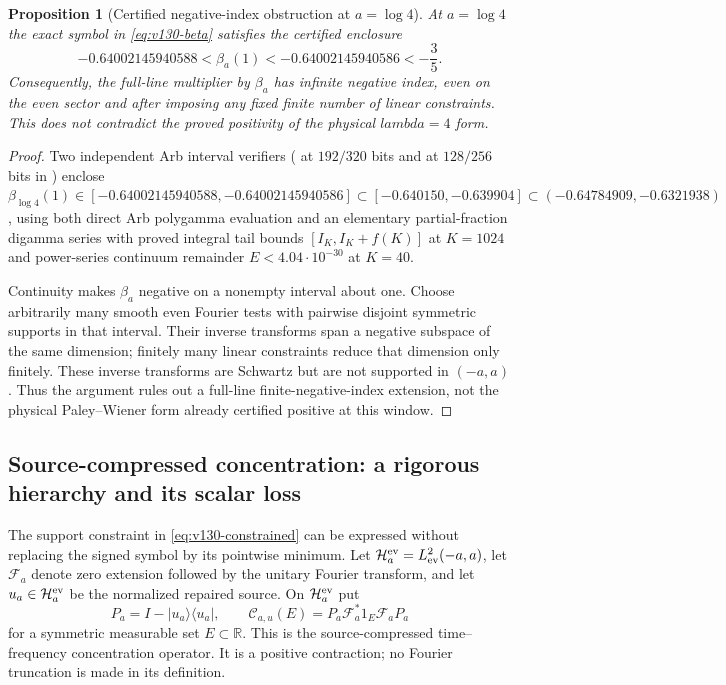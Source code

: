 \documentclass[11pt]{article}
\def\lambda{lambda}%
\newtheorem{proposition}[theorem]{Proposition}
\theoremstyle{remark}
\begin{document}
\begin{proposition}[Certified negative-index obstruction at $a=\log 4$]
\label{prop:v132-global-index}
At $a=\log4$ the exact symbol in \eqref{eq:v130-beta} satisfies the certified enclosure
\[
 -0.64002145940588<\beta_a(1)<-0.64002145940586<-\frac35.
\]
Consequently, the full-line multiplier by $\beta_a$ has infinite
negative index, even on the even sector and after imposing any fixed
finite number of linear constraints. This does not contradict the
proved positivity of the physical $\lambda=4$ form.
\end{proposition}
\begin{proof}
Two independent Arb interval verifiers ( at $192/320$ bits and  at $128/256$ bits in ) enclose $\beta_{\log 4}(1)\in [-0.64002145940588,-0.64002145940586]\subset [-0.640150,-0.639904]\subset (-0.64784909,-0.6321938)$, using both direct Arb polygamma evaluation and an elementary partial-fraction digamma series with proved integral tail bounds $[I_K,I_K+f(K)]$ at $K=1024$ and power-series continuum remainder $E<4.04\cdot 10^{-30}$ at $K=40$.

Continuity makes $\beta_a$ negative on a nonempty interval about one.
Choose arbitrarily many smooth even Fourier tests with pairwise
disjoint symmetric supports in that interval. Their inverse transforms
span a negative subspace of the same dimension; finitely many linear
constraints reduce that dimension only finitely. These inverse
transforms are Schwartz but are not supported in $(-a,a)$. Thus the
argument rules out a full-line finite-negative-index extension, not the
physical Paley--Wiener form already certified positive at this window.
\end{proof}

\subsection{Source-compressed concentration: a rigorous hierarchy and its scalar loss}

The support constraint in \eqref{eq:v130-constrained} can be expressed
without replacing the signed symbol by its pointwise minimum.  Let
$\mathcal H_a^{\rm ev}=L^2_{\rm ev}(-a,a)$, let $\mathcal F_a$ denote
zero extension followed by the unitary Fourier transform, and let
$u_a\in\mathcal H_a^{\rm ev}$ be the normalized repaired source.  On
$\mathcal H_a^{\rm ev}$ put
\[
 P_a=I-|u_a\rangle\langle u_a|,
 \qquad
 \mathcal C_{a,u}(E)
 =P_a\mathcal F_a^*1_E\mathcal F_aP_a
\]
for a symmetric measurable set $E\subset\mathbb R$.  This is the
source-compressed time--frequency concentration operator.  It is a
positive contraction; no Fourier truncation is made in its definition.
\end{document}
